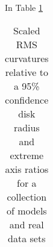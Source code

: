 In Table \ref{tbl:8.1}
\begin{table}
  \caption{\label{tbl:8.1}
  Scaled RMS curvatures relative to a 95\% confidence disk
  radius and extreme axis ratios for a collection of models and real
  data sets}
  \begin{tabular}{c c c c c c c c c}

\end{tabular}
\end{table}
